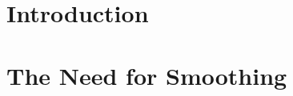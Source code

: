 \documentclass[conference]{IEEEtran}
\begin{document}
	
	
	
	
	
	
	
	\maketitle
	
	\begin{abstract}
		
	\end{abstract}
	
	
	
	
	

\section{Introduction}

\section{The Need for Smoothing}

\end{document}
